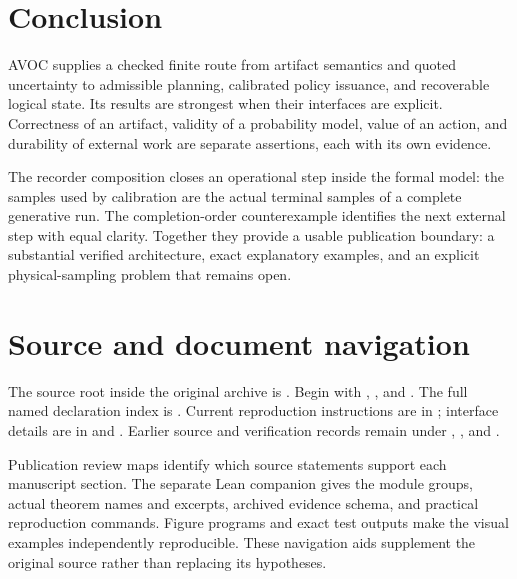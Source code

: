 \section{Conclusion}
AVOC supplies a checked finite route from artifact semantics and quoted uncertainty to admissible planning, calibrated policy issuance, and recoverable logical state. Its results are strongest when their interfaces are explicit. Correctness of an artifact, validity of a probability model, value of an action, and durability of external work are separate assertions, each with its own evidence.

The recorder composition closes an operational step inside the formal model: the samples used by calibration are the actual terminal samples of a complete generative run. The completion-order counterexample identifies the next external step with equal clarity. Together they provide a usable publication boundary: a substantial verified architecture, exact explanatory examples, and an explicit physical-sampling problem that remains open.

\appendix
\section{Source and document navigation}
The source root inside the original archive is . Begin with , , and . The full named declaration index is . Current reproduction instructions are in ; interface details are in  and . Earlier source and verification records remain under , , and .

Publication review maps identify which source statements support each manuscript section. The separate Lean companion gives the module groups, actual theorem names and excerpts, archived evidence schema, and practical reproduction commands. Figure programs and exact test outputs make the visual examples independently reproducible. These navigation aids supplement the original source rather than replacing its hypotheses.

